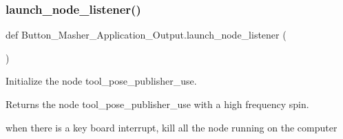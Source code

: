 \subsubsection{\texorpdfstring{launch\+\_\+node\+\_\+listener()}{launch\_node\_listener()}}
{\footnotesize\ttfamily def Button\+\_\+\+Masher\+\_\+\+Application\+\_\+\+Output.\+launch\+\_\+node\+\_\+listener (\begin{DoxyParamCaption}{ }\end{DoxyParamCaption})}



Initialize the node tool\+\_\+pose\+\_\+publisher\+\_\+use. 

\begin{DoxyReturn}{Returns}
the node tool\+\_\+pose\+\_\+publisher\+\_\+use with a high frequency spin. 

when there is a key board interrupt, kill all the node running on the computer 
\end{DoxyReturn}
